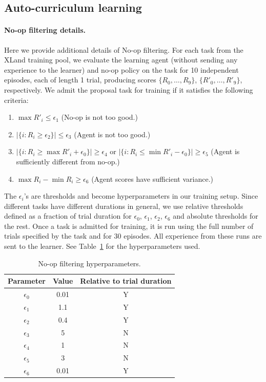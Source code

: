 \subsection{Auto-curriculum learning}
\label{app:autocurriculum}

\paragraph{No-op filtering details.} Here we provide additional details of No-op filtering. For each task from the XLand training pool, we evaluate the learning agent (without sending any experience to the learner) and no-op policy on the task for 10 independent episodes, each of length 1 trial,
producing scores $\{R_0, \dots, R_9\}$, $\{R'_0, \dots, R'_9\}$, respectively. We admit the proposal task for training if it satisfies the following criteria:

\begin{enumerate}
    \item $\max R'_i \leq \epsilon_1$ (No-op is not too good.)
    \item $|\{i : R_i \geq \epsilon_2 \}| \leq \epsilon_3$ (Agent is not too good.)
    \item $|\{i : R_i \geq \max R'_i + \epsilon_0 \}| \geq \epsilon_4$ or $|\{i : R_i \leq \min R'_i - \epsilon_0 \}| \geq \epsilon_5$ (Agent is sufficiently different from no-op.)
    \item $\max R_i - \min R_i \geq \epsilon_6$ (Agent scores have sufficient variance.)
\end{enumerate}
The $\epsilon_i$'s are thresholds and become hyperparameters in our training setup. Since different tasks have different durations in general, we use relative thresholds defined as a fraction of trial duration for $\epsilon_0$, $\epsilon_1$, $\epsilon_2$, $\epsilon_6$ and absolute thresholds for the rest. Once a task is admitted for training, it is run using the full number of trials specified by the task and for 30 episodes. All experience from these runs are sent to the learner. See Table~\ref{tab:noop_hyperparameters} for the hyperparameters used.

\begin{table}[h!]
    \centering
    \caption{No-op filtering hyperparameters.}
    \begin{tabular}{c|c|c}
         Parameter & Value & Relative to trial duration \\ \hline
         $\epsilon_0$ & 0.01 & Y \\
         $\epsilon_1$ & 1.1 & Y \\
         $\epsilon_2$ & 0.4 & Y \\
         $\epsilon_3$ & 5 & N \\
         $\epsilon_4$ & 1 & N \\
         $\epsilon_5$ & 3 & N\\
         $\epsilon_6$ & 0.01 & Y 
    \end{tabular}
    \label{tab:noop_hyperparameters}
\end{table}

